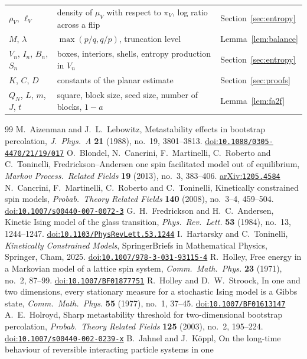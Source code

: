 \documentclass[11pt]{amsart}
\theoremstyle{remark}
\newcommand{\doi}[1]{\href{https://doi.org/#1}{doi:\nolinkurl{#1}}}
\newcommand{\arxiv}[1]{\href{https://arxiv.org/abs/#1}{arXiv:\nolinkurl{#1}}}
\begin{document}
\begin{center}
\begin{tabular}{p{3.3cm}p{7.6cm}p{3.2cm}}
$\rho_V$, $\ell_V$ & density of $\mu_V$ with respect to $\pi_V$, log ratio across a flip & Section~\ref{sec:entropy}\\
$M$, $\lambda$ & $\max(p/q,q/p)$, truncation level & Lemma~\ref{lem:balance}\\
$V_n$, $I_n$, $B_n$, $S_n$ & boxes, interiors, shells, entropy production in $V_n$ & Section~\ref{sec:entropy}\\
$K$, $C$, $D$ & constants of the planar estimate & Section~\ref{sec:proofs}\\
$Q_N$, $L$, $m$, $J$, $t$ & square, block size, seed size, number of blocks, $1-a$ & Lemma~\ref{lem:fa2f}\\
\bottomrule
\end{tabular}
\end{center}

\begin{thebibliography}{99}
 M.~Aizenman and J.~L.~Lebowitz, Metastability effects in bootstrap percolation, \emph{J.\ Phys.\ A}
\textbf{21} (1988), no.~19, 3801--3813. \doi{10.1088/0305-4470/21/19/017}
 O.~Blondel, N.~Cancrini, F.~Martinelli, C.~Roberto and C.~Toninelli, Fredrickson--Andersen one spin
facilitated model out of equilibrium, \emph{Markov Process.\ Related Fields} \textbf{19} (2013), no.~3, 383--406.
\arxiv{1205.4584}
 N.~Cancrini, F.~Martinelli, C.~Roberto and C.~Toninelli, Kinetically constrained spin models,
\emph{Probab.\ Theory Related Fields} \textbf{140} (2008), no.~3--4, 459--504. \doi{10.1007/s00440-007-0072-3}
 G.~H.~Fredrickson and H.~C.~Andersen, Kinetic Ising model of the glass transition, \emph{Phys.\ Rev.\
Lett.} \textbf{53} (1984), no.~13, 1244--1247. \doi{10.1103/PhysRevLett.53.1244}
\bibitem{HT25} I.~Hartarsky and C.~Toninelli, \emph{Kinetically Constrained Models}, SpringerBriefs in Mathematical
Physics, Springer, Cham, 2025. \doi{10.1007/978-3-031-93115-4}
 R.~Holley, Free energy in a Markovian model of a lattice spin system, \emph{Comm.\ Math.\ Phys.}
\textbf{23} (1971), no.~2, 87--99. \doi{10.1007/BF01877751}
 R.~Holley and D.~W.~Stroock, In one and two dimensions, every stationary measure for a stochastic Ising
model is a Gibbs state, \emph{Comm.\ Math.\ Phys.} \textbf{55} (1977), no.~1, 37--45. \doi{10.1007/BF01613147}
\bibitem{Hol03} A.~E.~Holroyd, Sharp metastability threshold for two-dimensional bootstrap percolation, \emph{Probab.\
Theory Related Fields} \textbf{125} (2003), no.~2, 195--224. \doi{10.1007/s00440-002-0239-x}
\bibitem{JK25} B.~Jahnel and J.~K\"oppl, On the long-time behaviour of reversible interacting particle systems in one

\end{thebibliography}
\end{document}
